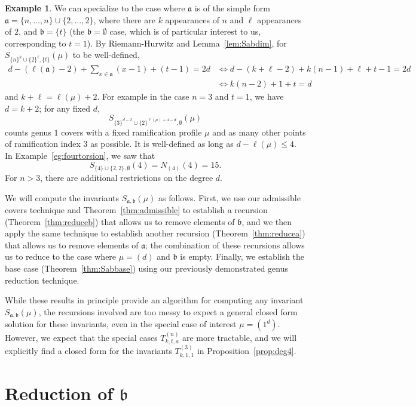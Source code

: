 \documentclass[thesis]{thesis-umich}           %
\renewcommand{\a}{\mathfrak a}
\renewcommand{\b}{\mathfrak b}
\theoremstyle{definition}
\newtheorem{eg}[thm]{Example}
\begin{document}
\begin{eg}
  \label{eg:Sabns}
  We can specialize to the case where $\a$ is of the simple form
  $\a=\{n,\dots,n\}\cup\{2,\dots,2\}$, where there are $k$ appearances
  of $n$ and $\ell$ appearances of $2$, and $\b=\{t\}$ (the $\b=\emptyset$
  case, which is of particular interest to us, corresponding to $t=1$).
  By Riemann-Hurwitz and Lemma~\ref{lem:Sabdim}, for
  $S_{\{n\}^k\cup\{2\}^{\ell},\{t\}}(\mu)$ to be well-defined,
  \begin{align*}
    d-(\ell(\a)-2)+\sum_{x\in\a}(x-1)+(t-1)=2d &\iff d-(k+\ell-2)+k(n-1)+\ell+t-1=2d \\
    &\iff k(n-2)+1+t=d
  \end{align*}
  and $k+\ell=\ell(\mu)+2$.
  For example in the case $n=3$ and $t=1$, we have $d=k+2$; for any fixed $d$,
  \[S_{\{3\}^{d-2}\cup\{2\}^{\ell(\mu)+4-d},\emptyset}(\mu)\] counts genus $1$ covers
  with a fixed ramification profile $\mu$ and as many other
  points of ramification index $3$ as possible. It is well-defined
  as long as $d-\ell(\mu)\leq 4$.
  In Example~\ref{eg:fourtorsion}, we saw that
  \[
  S_{\{4\}\cup\{2,2\},\emptyset}(4)=N_{(4)}(4)=15.
  \]
  For $n>3$, there are additional
  restrictions on the degree $d$.
  \end{eg}

We will compute the invariants $S_{\a,\b}(\mu)$ as follows. First,
we use our admissible covers technique
and Theorem~\ref{thm:admissible} to establish a recursion (Theorem~\ref{thm:reduceb}) that allows us to remove elements of
$\b$, and we then apply the same
technique to establish another recursion (Theorem~\ref{thm:reducea}) that allows us to remove elements of $\a$; the combination
of these recursions allows us to reduce to the case where $\mu=(d)$ and $\b$ is empty. Finally,
we establish the base case (Theorem~\ref{thm:Sabbase}) using our previously demonstrated genus reduction technique.

While these results in principle provide an algorithm for computing any invariant
$S_{\a,\b}(\mu)$, the recursions involved are too messy to expect a general closed
form solution for these invariants,
even in the special case of interest $\mu=(1^d)$. However, we expect that the special cases
$T_{k,t,a}^{(n)}$ are more tractable, and we will explicitly find a closed form
for the invariants $T_{k,1,1}^{(3)}$ in Proposition~\ref{prop:deg4}.

\section{Reduction of $\b$}
\end{document}
